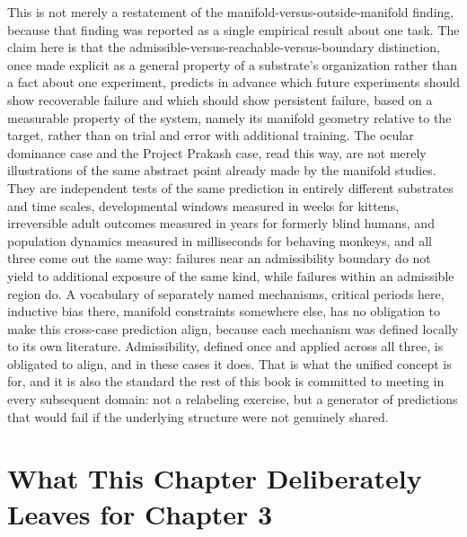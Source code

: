 \documentclass[11pt]{book}
\begin{document}
This is not merely a restatement of the manifold-versus-outside-manifold finding, because that finding was reported as a single empirical result about one task. The claim here is that the admissible-versus-reachable-versus-boundary distinction, once made explicit as a general property of a substrate's organization rather than a fact about one experiment, predicts in advance which future experiments should show recoverable failure and which should show persistent failure, based on a measurable property of the system, namely its manifold geometry relative to the target, rather than on trial and error with additional training. The ocular dominance case and the Project Prakash case, read this way, are not merely illustrations of the same abstract point already made by the manifold studies. They are independent tests of the same prediction in entirely different substrates and time scales, developmental windows measured in weeks for kittens, irreversible adult outcomes measured in years for formerly blind humans, and population dynamics measured in milliseconds for behaving monkeys, and all three come out the same way: failures near an admissibility boundary do not yield to additional exposure of the same kind, while failures within an admissible region do. A vocabulary of separately named mechanisms, critical periods here, inductive bias there, manifold constraints somewhere else, has no obligation to make this cross-case prediction align, because each mechanism was defined locally to its own literature. Admissibility, defined once and applied across all three, is obligated to align, and in these cases it does. That is what the unified concept is for, and it is also the standard the rest of this book is committed to meeting in every subsequent domain: not a relabeling exercise, but a generator of predictions that would fail if the underlying structure were not genuinely shared.

\section{What This Chapter Deliberately Leaves for Chapter 3}
\end{document}
